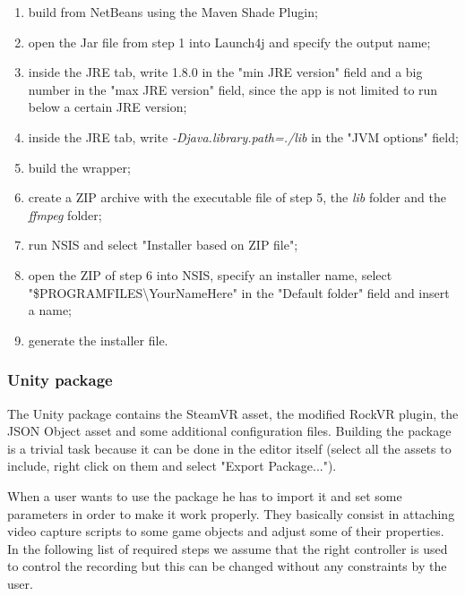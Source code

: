 \documentclass[binding=0.6cm,LaM]{sapthesis}
\begin{document}
\begin{enumerate}

\item build from NetBeans using the Maven Shade Plugin;

\item open the Jar file from step 1 into Launch4j and specify the output name;

\item inside the JRE tab, write 1.8.0 in the "min JRE version" field and a big number in the "max JRE version" field, since the app is not limited to run below a certain JRE version;

\item inside the JRE tab, write \textit{-Djava.library.path=./lib} in the "JVM options" field;

\item build the wrapper;

\item create a ZIP archive with the executable file of step 5, the \textit{lib} folder and the \textit{ffmpeg} folder;

\item run NSIS and select "Installer based on ZIP file";

\item open the ZIP of step 6 into NSIS, specify an installer name, select "\$PROGRAMFILES\textbackslash YourNameHere" in the "Default folder" field and insert a name;

\item generate the installer file.

\end{enumerate}

\subsubsection{Unity package}
The Unity package contains the SteamVR asset, the modified RockVR plugin, the JSON Object asset and some additional configuration files. Building the package is a trivial task because it can be done in the editor itself (select all the assets to include, right click on them and select "Export Package...").

When a user wants to use the package he has to import it and set some parameters in order to make it work properly. They basically consist in attaching video capture scripts to some game objects and adjust some of their properties. 
In the following list of required steps we assume that the right controller is used to control the recording but this can be changed without any constraints by the user.
\end{document}
